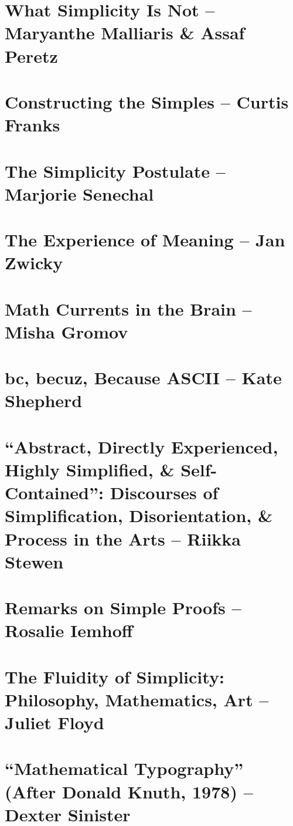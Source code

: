 \documentclass[oneside]{book}
\numberwithin{equation}{section}
\begin{document}
\section{What Simplicity Is Not -- Maryanthe Malliaris \& Assaf Peretz}

\section{Constructing the Simples -- Curtis Franks}

\section{The Simplicity Postulate -- Marjorie Senechal}

\section{The Experience of Meaning -- Jan Zwicky}

\section{Math Currents in the Brain -- Misha Gromov}

\section{bc, becuz, Because ASCII -- Kate Shepherd}

\section{``Abstract, Directly Experienced, Highly Simplified, \& Self-Contained'': Discourses of Simplification, Disorientation, \& Process in the Arts -- Riikka Stewen}

\section{Remarks on Simple Proofs -- Rosalie Iemhoff}

\section{The Fluidity of Simplicity: Philosophy, Mathematics, Art -- Juliet Floyd}

\section{``Mathematical Typography'' (After Donald Knuth, 1978) -- Dexter Sinister}
\end{document}
